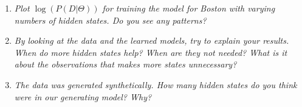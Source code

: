 \documentclass{article}
\begin{document}
\begin{enumerate}[(a)]
\begin{enumerate}
  \item \emph{Plot $\log(P(D|\Theta))$ for training the model for Boston with
    varying numbers of hidden states. Do you see any patterns?}

  \item \emph{By looking at the data and the learned models, try to explain your
    results. When do more hidden states help? When are they not needed? What is
    it about the observations that makes more states unnecessary?}

  \item \emph{The data was generated synthetically. How many hidden states do you
    think were in our generating model? Why?}

  \end{enumerate}
\end{enumerate}
\end{document}
